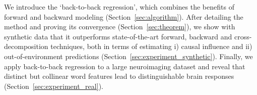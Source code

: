 We introduce the `back-to-back regression', which combines the benefits of forward and backward modeling (Section~\ref{sec:algorithm}). After detailing the method and proving its convergence (Section~\ref{sec:theorem}), we show with synthetic data that it outperforms state-of-the-art forward, backward and cross-decomposition techniques, both in terms of estimating i) causal influence and ii) out-of-environment predictions (Section~\ref{sec:experiment_synthetic}). Finally, we apply back-to-back regression to a large neuroimaging dataset and reveal that distinct but collinear word features lead to distinguishable brain responses (Section~\ref{sec:experiment_real}).

